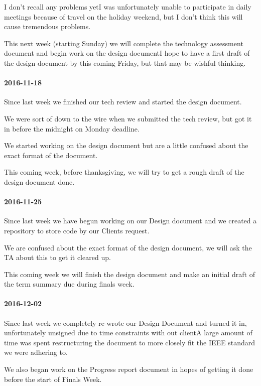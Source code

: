I don't recall any problems yetI was unfortunately unable to participate in daily meetings because of travel on the holiday weekend, but I don't think this will cause tremendous problems.

This next week (starting Sunday) we will complete the technology assessment document and begin work on the design documentI hope to have a first draft of the design document by this coming Friday, but that may be wishful thinking.

\paragraph{2016-11-18}

Since last week we finished our tech review and started the design document.

We were sort of down to the wire when we submitted the tech review, but got it in before the midnight on Monday deadline.

We started working on the design document but are a little confused about the exact format of the document.

This coming week, before thanksgiving, we will try to get a rough draft of the design document done.

\paragraph{2016-11-25}

Since last week we have begun working on our Design document and we created a repository to store code by our Clients request.

We are confused about the exact format of the design document, we will ask the TA about this to get it cleared up.

This coming week we will finish the design document and make an initial draft of the term summary due during finals week.

\paragraph{2016-12-02}

Since last week we completely re-wrote our Design Document and turned it in, unfortunately unsigned due to time constraints with out clientA large amount of time was spent restructuring the document to more closely fit the IEEE standard we were adhering to.

We also began work on the Progress report document in hopes of getting it done before the start of Finals Week.

